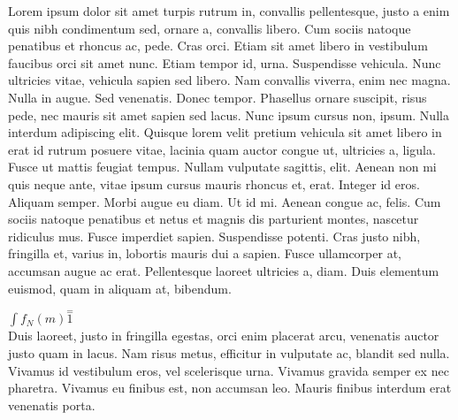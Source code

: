 \documentclass{article}
\begin{document}
Lorem ipsum dolor sit amet turpis rutrum in, convallis pellentesque, justo a enim quis nibh condimentum sed, ornare a, convallis libero. Cum sociis natoque penatibus et rhoncus ac, pede. Cras orci. Etiam sit amet libero in vestibulum faucibus orci sit amet nunc. Etiam tempor id, urna. Suspendisse vehicula. Nunc ultricies vitae, vehicula sapien sed libero. Nam convallis viverra, enim nec magna. Nulla in augue. Sed venenatis. Donec tempor. Phasellus ornare suscipit, risus pede, nec mauris sit amet sapien sed lacus. Nunc ipsum cursus non, ipsum. Nulla interdum adipiscing elit. Quisque lorem velit pretium vehicula sit amet libero in erat id rutrum posuere vitae, lacinia quam auctor congue ut, ultricies a, ligula. Fusce ut mattis feugiat tempus. Nullam vulputate sagittis, elit. Aenean non mi quis neque ante, vitae ipsum cursus mauris rhoncus et, erat. Integer id eros. Aliquam semper. Morbi augue eu diam. Ut id mi. Aenean congue ac, felis. Cum sociis natoque penatibus et netus et magnis dis parturient montes, nascetur ridiculus mus. Fusce imperdiet sapien. Suspendisse potenti. Cras justo nibh, fringilla et, varius in, lobortis mauris dui a sapien. Fusce ullamcorper at, accumsan augue ac erat. Pellentesque laoreet ultricies a, diam. Duis elementum euismod, quam in aliquam at, bibendum.

\begin{math}
	\int {f_N(m) \stackrel{=} 1}
\end{math}\\
Duis laoreet, justo in fringilla egestas, orci enim placerat arcu, venenatis auctor justo quam in lacus. Nam risus metus, efficitur in vulputate ac, blandit sed nulla. Vivamus id vestibulum eros, vel scelerisque urna. Vivamus gravida semper ex nec pharetra. Vivamus eu finibus est, non accumsan leo. Mauris finibus interdum erat venenatis porta. 
\end{document}
